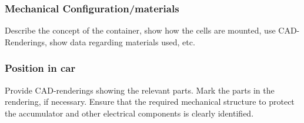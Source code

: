 \subsubsection{Mechanical Configuration/materials}
Describe the concept of the container, show how the cells are mounted, use CAD-Renderings, show data regarding materials used, etc.

\subsubsection{Position in car}
Provide CAD-renderings showing the relevant parts. Mark the parts in the rendering, if necessary.  Ensure that the required mechanical structure to protect the accumulator and other electrical components is clearly identified.






